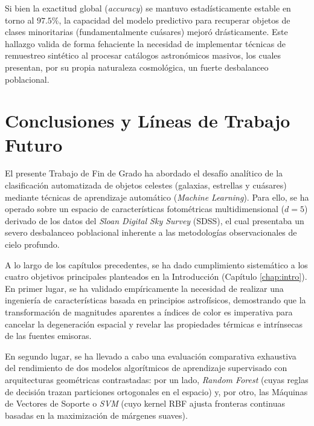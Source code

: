 \documentclass[12pt, a4paper]{report}
\begin{document}
Si bien la exactitud global (\textit{accuracy}) se mantuvo estadísticamente estable en torno al $97.5\%$, la capacidad del modelo predictivo para recuperar objetos de clases minoritarias (fundamentalmente cuásares) mejoró drásticamente. Este hallazgo valida de forma fehaciente la necesidad de implementar técnicas de remuestreo sintético al procesar catálogos astronómicos masivos, los cuales presentan, por su propia naturaleza cosmológica, un fuerte desbalanceo poblacional.


\chapter{Conclusiones y Líneas de Trabajo Futuro}
\label{chap:conclusiones}

El presente Trabajo de Fin de Grado ha abordado el desafío analítico de la clasificación automatizada de objetos celestes (galaxias, estrellas y cuásares) mediante técnicas de aprendizaje automático (\textit{Machine Learning}). Para ello, se ha operado sobre un espacio de características fotométricas multidimensional ($d=5$) derivado de los datos del \textit{Sloan Digital Sky Survey} (SDSS), el cual presentaba un severo desbalanceo poblacional inherente a las metodologías observacionales de cielo profundo.

A lo largo de los capítulos precedentes, se ha dado cumplimiento sistemático a los cuatro objetivos principales planteados en la Introducción (Capítulo \ref{chap:intro}). En primer lugar, se ha validado empíricamente la necesidad de realizar una ingeniería de características basada en principios astrofísicos, demostrando que la transformación de magnitudes aparentes a índices de color es imperativa para cancelar la degeneración espacial y revelar las propiedades térmicas e intrínsecas de las fuentes emisoras.

En segundo lugar, se ha llevado a cabo una evaluación comparativa exhaustiva del rendimiento de dos modelos algorítmicos de aprendizaje supervisado con arquitecturas geométricas contrastadas: por un lado, \textit{Random Forest} (cuyas reglas de decisión trazan particiones ortogonales en el espacio) y, por otro, las Máquinas de Vectores de Soporte o \textit{SVM} (cuyo kernel RBF ajusta fronteras continuas basadas en la maximización de márgenes suaves).
\end{document}
